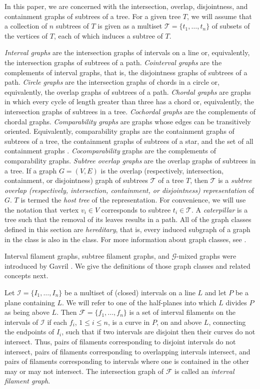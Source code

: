 \documentclass[
final
]{dmtcs-episciences}        \usepackage{graphics, amsthm, amsmath, amssymb, algorithm, algorithmic}
\begin{document}
In this paper, we are concerned with the intersection, overlap, disjointness, and containment graphs of subtrees of a tree. For a given tree $T$, we will assume that a collection of $n$ subtrees of $T$ is given as a multiset $\mathcal T = \{ t_1, \ldots, t_n \}$ of subsets of the vertices of $T$, each of which induces a subtree of $T$.

{\em Interval graphs} are the intersection graphs of intervals
on a line or, equivalently, the intersection graphs of subtrees of a path.
{\em Cointerval graphs} are the complements of interval graphs, that is, the disjointness graphs of subtrees of a path.
{\em Circle graphs} are the 
intersection graphs of chords in a circle or, equivalently, the overlap graphs of subtrees of a path.  {\em Chordal graphs} are graphs in which
every cycle of length greater than three has a chord
or, equivalently, the intersection graphs of subtrees in
a tree. 
{\em Cochordal graphs} are the complements of chordal graphs.
{\em Comparability graphs} are graphs whose edges
can be transitively oriented. Equivalently, comparability
graphs are the containment graphs of subtrees of a
tree, the containment graphs of subtrees of a star, and
the set of all containment graphs \cite{GolSch}. 
{\em Cocomparability} graphs are the complements of comparability graphs.
{\em Subtree overlap graphs} are the overlap graphs of subtrees in a tree.
If a graph $G=(V,E)$ is the overlap (respectively, intersection, containment, or disjointness) graph of 
subtrees $\mathcal{T}$ of a tree $T$, then $\mathcal{T}$ is a \emph{subtree overlap (respectively, intersection, containment, or disjointness) representation} of $G$. $T$ is termed the {\em host tree} of the representation. For convenience, we will use the notation that vertex $v_i \in V$ corresponds to subtree $t_i \in \mathcal{T}$. 
A {\em caterpillar} is a tree such that the removal of its leaves results in a path.
All of the graph classes defined in this section are {\em hereditary}, that is, every induced subgraph of a graph in the class is also in the class.
For more information about graph classes, see \cite{BLS}.

Interval filament graphs, subtree filament graphs, and $\mathcal G$-mixed graphs were introduced by Gavril \cite{gavril2000}. We give the definitions of those graph classes and related concepts next.

Let $\mathcal I = \{I_1, \ldots, I_n \}$ be a multiset of (closed) intervals on a line $L$ and let $P$ be a plane containing $L$. We will refer to one of the half-planes into which $L$ divides $P$ as being above $L$.
Then $\mathcal F = \{f_1, \ldots, f_n \}$ is a set of interval filaments on the intervals of $\mathcal I$ if
each $f_i$, $1 \le i \le n$, is a curve in $P$, on and above $L$, connecting the endpoints of $I_i$, such that if two intervals are disjoint then their curves do not intersect.
Thus, pairs of filaments corresponding to disjoint intervals do not intersect, pairs of filaments corresponding to overlapping intervals intersect, and pairs of filaments corresponding to intervals where one is contained in the other may or may not intersect.
The intersection graph of $\mathcal F$ is called an {\em interval filament graph}.
\end{document}

